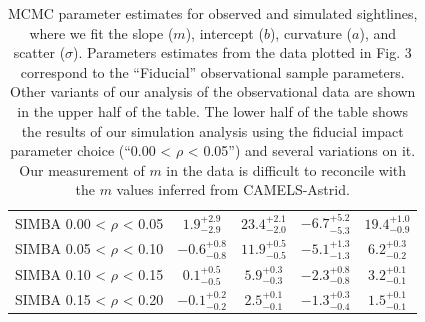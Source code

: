 \begin{table}[htbp]
\begin{tabular}{|c|c|c|c|c|}
SIMBA 0.00 < $\rho$ < 0.05 & $1.9^{+2.9}_{-2.9}$ & $23.4^{+2.1}_{-2.0}$ & $-6.7^{+5.2}_{-5.3}$ & $19.4^{+1.0}_{-0.9}$ \\
SIMBA 0.05 < $\rho$ < 0.10 & $-0.6^{+0.8}_{-0.8}$ & $11.9^{+0.5}_{-0.5}$ & $-5.1^{+1.3}_{-1.3}$ & $6.2^{+0.3}_{-0.2}$ \\
SIMBA 0.10 < $\rho$ < 0.15 & $0.1^{+0.5}_{-0.5}$ & $5.9^{+0.3}_{-0.3}$ & $-2.3^{+0.8}_{-0.8}$ & $3.2^{+0.1}_{-0.1}$ \\
SIMBA 0.15 < $\rho$ < 0.20 & $-0.1^{+0.2}_{-0.2}$ & $2.5^{+0.1}_{-0.1}$ & $-1.3^{+0.3}_{-0.4}$ & $1.5^{+0.1}_{-0.1}$ \\
\hline
\end{tabular}
\caption{MCMC parameter estimates for observed and simulated sightlines, where we fit the slope ($m$), intercept ($b$), curvature ($a$), and scatter ($\sigma$). Parameters estimates from the data plotted in Fig. 3 correspond to the “Fiducial” observational sample parameters. Other variants of our analysis of the observational data are shown in the upper half of the table. The lower half of the table shows the results of our simulation analysis using the fiducial impact parameter choice (``0.00 < $\rho$ < 0.05'') and several variations on it. Our measurement of $m$ in the data is difficult to reconcile with the $m$ values inferred from CAMELS-Astrid.}
\label{tab:params}
\end{table}
